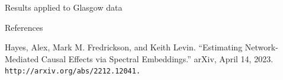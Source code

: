 \documentclass[final]{beamer}
\newlength{\sepwidth}
\newlength{\colwidth}
\newcommand{\separatorcolumn}{\begin{column}{\sepwidth}\end{column}}
\begin{document}
\begin{frame}[t]
\begin{columns}[t]
\begin{column}{\colwidth}
\begin{block}{Results applied to Glasgow data}
            \end{block}

            \begin{block}{References}

                Hayes, Alex, Mark M. Fredrickson, and Keith Levin. ``Estimating Network-Mediated Causal Effects via Spectral Embeddings.'' arXiv, April 14, 2023. \texttt{http://arxiv.org/abs/2212.12041.}

            \end{block}

        \end{column}

        \separatorcolumn
    \end{columns}
\end{frame}
\end{document}
